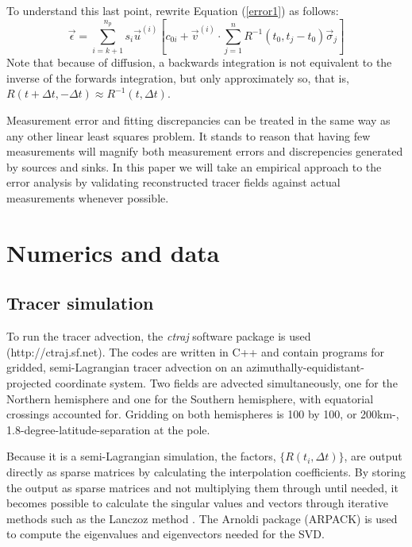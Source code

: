 \documentclass{article}
\begin{document}
To understand this last point, rewrite Equation (\ref{error1}) as follows:
\begin{equation}
	\vec \epsilon = \sum_{i=k+1}^{n_p} s_i \vec u^{(i)} \left [c_{0i}
	+ \vec v^{(i)} \cdot \sum_{j=1}^n R^{-1}(t_0, t_j-t_0) \vec \sigma_j \right ]
\end{equation}
Note that because of diffusion, 
a backwards integration is not equivalent to the inverse of the
forwards integration, but only approximately so, that is,
$R(t+\Delta t, -\Delta t) \approx R^{-1}(t, \Delta t)$.

Measurement error and fitting discrepancies can be treated in the same way 
as any other linear least squares problem. 
It stands to reason that having few measurements will magnify both
measurement errors and discrepencies generated by sources and sinks.
In this paper we will take an empirical approach to the error analysis by
validating reconstructed tracer fields against actual measurements whenever
possible.


\section{Numerics and data}

\subsection{Tracer simulation}

To run the tracer advection, the \textit{ctraj} software package is used
(http://ctraj.sf.net).  The codes are written in C++ and contain programs
for gridded, semi-Lagrangian tracer advection on an 
azimuthally-equidistant-projected coordinate system.
Two fields are advected simultaneously, one for the Northern hemisphere
and one for the Southern hemisphere, with equatorial crossings accounted for.
Gridding on both hemispheres is 100 by 100, or 200km-,
1.8-degree-latitude-separation at the pole.

Because it is a semi-Lagrangian simulation, the factors, $\lbrace R(t_i,\Delta t) \rbrace$,
are output directly as sparse matrices by calculating the interpolation coefficients.
By storing the output as sparse matrices and not multiplying them through until
needed, it becomes possible to calculate the singular values and vectors through iterative
methods such as the Lanczoz method \citep{Golub_Van_Loan1996}.
The Arnoldi package (ARPACK) \citep{Lehoucq_Scott1996} is used to compute the
eigenvalues and eigenvectors needed for the SVD.
\end{document}
